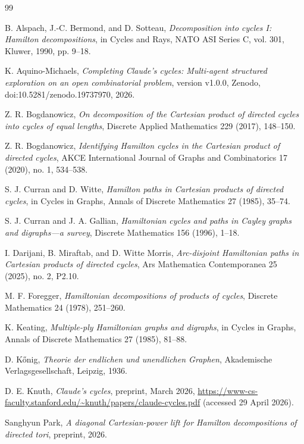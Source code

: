 \documentclass[11pt]{article}
\theoremstyle{definition}
\begin{document}
\begin{thebibliography}{99}

B. Alspach, J.-C. Bermond, and D. Sotteau,
\emph{Decomposition into cycles I: Hamilton decompositions},
in Cycles and Rays, NATO ASI Series C, vol. 301, Kluwer, 1990, pp. 9--18.

K. Aquino-Michaels,
\emph{Completing Claude's cycles: Multi-agent structured exploration on an open combinatorial problem},
version v1.0.0, Zenodo, doi:10.5281/zenodo.19737970, 2026.

Z. R. Bogdanowicz,
\emph{On decomposition of the Cartesian product of directed cycles into cycles of equal lengths},
Discrete Applied Mathematics 229 (2017), 148--150.

Z. R. Bogdanowicz,
\emph{Identifying Hamilton cycles in the Cartesian product of directed cycles},
AKCE International Journal of Graphs and Combinatorics 17 (2020), no. 1, 534--538.

S. J. Curran and D. Witte,
\emph{Hamilton paths in Cartesian products of directed cycles},
in Cycles in Graphs, Annals of Discrete Mathematics 27 (1985), 35--74.


S. J. Curran and J. A. Gallian,
\emph{Hamiltonian cycles and paths in Cayley graphs and digraphs---a survey},
Discrete Mathematics 156 (1996), 1--18.

I. Darijani, B. Miraftab, and D. Witte Morris,
\emph{Arc-disjoint Hamiltonian paths in Cartesian products of directed cycles},
Ars Mathematica Contemporanea 25 (2025), no. 2, P2.10.

M. F. Foregger,
\emph{Hamiltonian decompositions of products of cycles},
Discrete Mathematics 24 (1978), 251--260.

K. Keating,
\emph{Multiple-ply Hamiltonian graphs and digraphs},
in Cycles in Graphs, Annals of Discrete Mathematics 27 (1985), 81--88.

D. K\H{o}nig,
\emph{Theorie der endlichen und unendlichen Graphen},
Akademische Verlagsgesellschaft, Leipzig, 1936.

D. E. Knuth,
\emph{Claude's cycles}, preprint, March 2026,
\url{https://www-cs-faculty.stanford.edu/~knuth/papers/claude-cycles.pdf} (accessed 29 April 2026).

Sanghyun Park,
\emph{A diagonal Cartesian-power lift for Hamilton decompositions of directed tori}, preprint, 2026.


\end{thebibliography}
\end{document}
